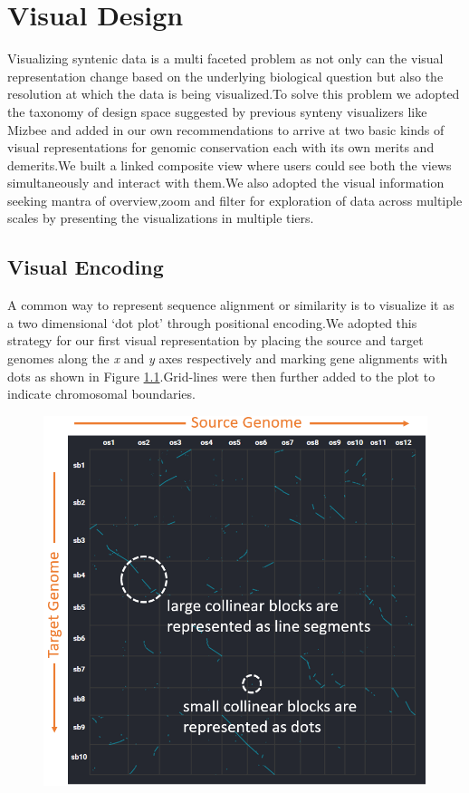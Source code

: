 \chapter{Visual Design}

Visualizing syntenic data is a multi faceted problem as not only can the visual representation change based on the underlying biological question but also the resolution at which the data is being visualized.To solve this problem we adopted the taxonomy of design space suggested by previous synteny visualizers like Mizbee \cite{Meyer2009} and added in our own recommendations to arrive at two basic kinds of visual representations for genomic conservation each with its own merits and demerits.We built a linked composite view where users could see both the views simultaneously and interact with them.We also adopted the visual information seeking mantra of overview,zoom and filter for exploration of data across multiple scales by presenting the visualizations in multiple tiers. 

\section{Visual Encoding}

A common way to represent sequence alignment or similarity is to visualize it as a two dimensional `dot plot' \cite{SONNHAMMER1995GC1,Cabanettes2018} through positional encoding.We adopted this strategy for our first visual representation by placing the source and target genomes along the \textit{x} and \textit{y} axes respectively and marking gene alignments with dots as shown in Figure \ref{fig:ch_4_dot_plot_a}.Grid-lines were then further added to the plot to indicate chromosomal boundaries.

\begin{figure}[h]
  \centering
  \includegraphics[width=.475\linewidth]{images/ch_4_dot_plot_a.PNG}
  \label{fig:ch_4_dot_plot_a}
\end{figure}

